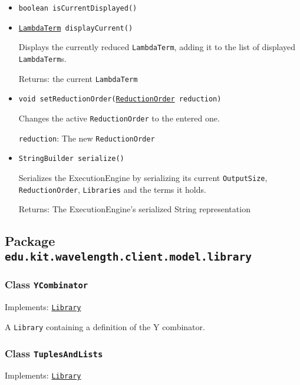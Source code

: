 \begin{itemize}
\item \texttt{boolean isCurrentDisplayed()}



\item \texttt{\hyperref[type:edu.kit.wavelength.client.model.term.LambdaTerm]{LambdaTerm} displayCurrent()}

Displays the currently reduced \texttt{LambdaTerm}, adding it to the list of
 displayed \texttt{LambdaTerm}s.

Returns: the current \texttt{LambdaTerm}

\item \texttt{void setReductionOrder(\hyperref[type:edu.kit.wavelength.client.model.reduction.ReductionOrder]{ReductionOrder} reduction)}

Changes the active \texttt{ReductionOrder} to the entered one.

\texttt{reduction}: The new \texttt{ReductionOrder}

\item \texttt{StringBuilder serialize()}

Serializes the ExecutionEngine by serializing its current \texttt{OutputSize},
 \texttt{ReductionOrder}, \texttt{Libraries} and the terms it holds.

Returns: The ExecutionEngine's serialized String representation

\end{itemize}

\subsection{Package \lstinline{edu.kit.wavelength.client.model.library}}
\label{pkg:edu.kit.wavelength.client.model.library}


\subsubsection{Class \texttt{YCombinator}}
\label{type:edu.kit.wavelength.client.model.library.YCombinator}
Implements: \texttt{\hyperref[type:edu.kit.wavelength.client.model.library.Library]{Library}}

A \texttt{Library} containing a definition of the Y combinator.

\subsubsection{Class \texttt{TuplesAndLists}}
\label{type:edu.kit.wavelength.client.model.library.TuplesAndLists}
Implements: \texttt{\hyperref[type:edu.kit.wavelength.client.model.library.Library]{Library}}

